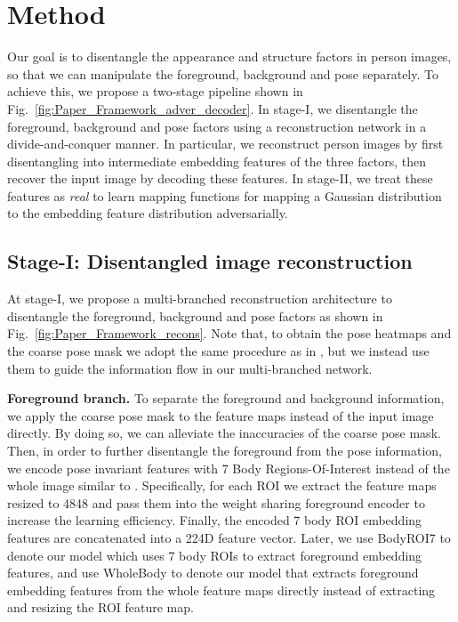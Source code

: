 \documentclass[10pt,twocolumn,letterpaper]{article}
\newcommand{\myparagraph}[1]{\vspace{0.0em}\noindent\textbf{#1}}
\begin{document}
 \vspace{-1mm}
\section{Method}
\label{sec:method}
\vspace{-2mm}

Our goal is to disentangle the appearance and structure factors in person images, so that we can manipulate the foreground, background and pose separately. 
To achieve this, we propose a two-stage pipeline shown in Fig.~\ref{fig:Paper_Framework_adver_decoder}. 
In stage-\RN{1}, we disentangle the foreground, background and pose factors using a reconstruction network in a divide-and-conquer manner. 
In particular, we reconstruct person images by first disentangling into intermediate embedding features of the three factors, then recover the input image by decoding these features. 
In stage-\RN{2}, we treat these features as {\it real} to learn mapping functions  for mapping a Gaussian distribution 
to the embedding feature distribution adversarially.


\subsection{Stage-\RN{1}: Disentangled image reconstruction}
\label{sec:method_stageI}
At stage-\RN{1}, we propose a multi-branched reconstruction architecture to disentangle the foreground, background and pose factors as shown in Fig.~\ref{fig:Paper_Framework_recons}. 
Note that, to obtain the pose heatmaps and the coarse pose mask we adopt the same procedure as in \cite{PG2}, but we instead use them to guide the information flow in our multi-branched network.

\myparagraph{Foreground branch.} 
To separate the foreground and background information, we apply the coarse pose mask to the feature maps instead of the input image directly.
By doing so, we can alleviate the inaccuracies of the coarse pose mask. 
Then, in order to further disentangle the foreground from the pose information, we encode pose invariant features with 7 Body Regions-Of-Interest instead of the whole image similar to \cite{RegionReid2017}. 
Specifically, for each ROI we extract the feature maps resized to 4848 and pass them into the weight sharing foreground encoder to increase the learning efficiency. 
Finally, the encoded 7 body ROI embedding features are concatenated into a 224D feature vector. 
Later, we use BodyROI7 to denote our model which uses 7 body ROIs to extract foreground embedding features, and use WholeBody to denote our model that extracts foreground embedding features from the whole feature maps directly instead of extracting and resizing the ROI feature map.
\end{document}
